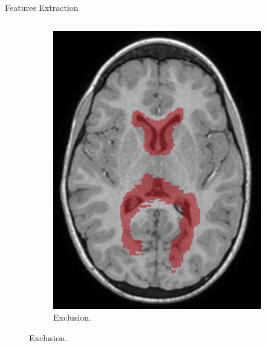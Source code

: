 \documentclass[]{standalone}
\begin{document}
\begin{frame}{Features Extraction}{}
\begin{columns}
\begin{column}{0.50\textwidth}
\begin{figure}[h!]
\begin{subfigure}{0.4\textwidth}
					\includegraphics[scale=0.07]{./IMG/exclude.jpg}
					\caption*{Exclusion.}
				\end{subfigure}
			\end{figure}
			\end{column}
		\end{columns}
	\end{frame}
\end{document}
